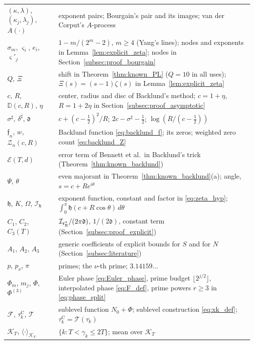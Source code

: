 \documentclass[11pt,a4paper]{article}
\makeatletter
\numberwithin{equation}{section}
\DeclareRobustCommand{\CGref}[1]{\ref{#1}}
\DeclareRobustCommand{\CGeqref}[1]{\eqref{#1}}
\let\CG@origref\ref
\let\CG@origeqref\eqref
\newcommand{\CG@gettip}[1]{\@ifundefined{CGTip@#1}{#1}{\csname CGTip@#1\endcsname}}
\DeclareRobustCommand{\CGref}[1]{\pdftooltip{\CG@origref{#1}}{\CG@gettip{#1}}}
\DeclareRobustCommand{\CGeqref}[1]{\pdftooltip{\CG@origeqref{#1}}{\CG@gettip{#1}}}
\theoremstyle{definition}
\theoremstyle{remark}
\newcommand{\Nz}{N_0} %
\newcommand{\Fc}{\mathcal F}
\newcommand{\Tc}{\mathcal T}
\newcommand{\Ph}{\Phi}
\newcommand{\eE}{\mathfrak e_{\rm E}}
\newcommand{\Kc}{\mathcal K}
\makeatother
\begin{document}
\begin{center}
\begin{longtable}{p{}p{}}
$(\kappa,\lambda)$, $(\kappa_j,\lambda_j)$, $A(\cdot)$ & exponent pairs; Bourgain's pair and its images; van der Corput's $A$-process\\
$\sigma_m$, $\varsigma_i$, $e_i$, $\varsigma'_j$ & $1-m/(2^m-2)$, $m\ge4$ (Yang's lines); nodes and exponents in Lemma~\CGref{lem:explicit_zeta}; nodes in Section~\CGref{subsec:proof_bourgain}\\
$Q$, $\Xi$ & shift in Theorem~\CGref{thm:known_PL} ($Q=10$ in all uses); $\Xi(s)=(s-1)\zeta(s)$ in Lemma~\CGref{lem:explicit_zeta}\\
$c$, $R$, $\mathbb D(c,R)$, $\eta$ & center, radius and disc of Backlund's method; $c=1+\eta$, $R=1+2\eta$ in Section~\CGref{subsec:proof_asymptotic}\\
$\sigma^\sharp$, $\delta^\sharp$, $\mathfrak d$ & $c+(c-\frac12)^2/R$; $2c-\sigma^\sharp-\frac12$; $\log(R/(c-\frac12))$\\
$\mathfrak f_n$, $w$, $\mathcal Z_n(c,R)$ & Backlund function \CGeqref{eq:backlund_f}; its zeros; weighted zero count \CGeqref{eq:backlund_Z}\\
$\mathcal E(T,d)$ & error term of Bennett et al.\ in Backlund's trick (Theorem~\CGref{thm:known_backlund})\\
$\Psi$, $\theta$ & even majorant in Theorem~\CGref{thm:known_backlund}(a); angle, $s=c+Re^{i\theta}$\\
$\mathfrak h$, $K$, $\Omega$, $\mathcal I_{\mathfrak h}$ & exponent function, constant and factor in \CGeqref{eq:zeta_hyp}; $\int_0^\pi\mathfrak h(c+R\cos\theta)\,d\theta$\\
$C_1$, $C_2$, $C_3(T)$ & $\mathcal I_{\eE^*}/(2\pi\mathfrak d)$, $1/(2\mathfrak d)$, constant term (Section~\CGref{subsec:proof_explicit})\\
$A_1$, $A_2$, $A_3$ & generic coefficients of explicit bounds for $S$ and for $N$ (Section~\CGref{subsec:literature})\\
$p$, $p_\nu$, $\pi$ & primes; the $\nu$-th prime; $3.14159\ldots$\\
$\Ph_m$, $m_j$, $\Ph$, $\Ph^{(3)}$ & Euler phase \CGeqref{eq:Euler_phase}, prime budget $\lfloor2^{j/2}\rfloor$, interpolated phase \CGeqref{eq:F_def}, prime powers $r\ge3$ in \CGeqref{eq:phase_split}\\
$\Fc$, $\tau_{k}^{\mathrm C}$, $\Tc$ & sublevel function $\Nz+\Ph$; sublevel construction \CGeqref{eq:xk_def}; $\tau_{k}^{\mathrm C}=\Tc(\tau_k)$\\
$\Kc_T$, $\langle\cdot\rangle_{\Kc_T}$ & $\{k:T<\gamma_k\le2T\}$; mean over $\Kc_T$\\

\end{longtable}
\end{center}
\end{document}
